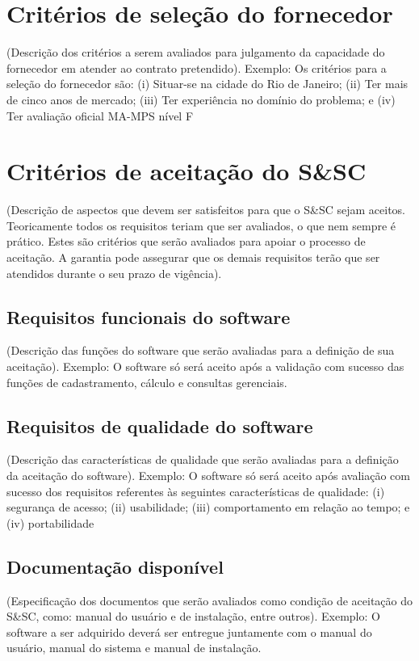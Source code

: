 \section{Critérios de seleção do fornecedor}
(Descrição dos critérios a serem avaliados para julgamento da capacidade do
fornecedor em atender ao contrato pretendido).
Exemplo: Os critérios para a seleção do fornecedor são:
(i) Situar-se na cidade do Rio de Janeiro;
(ii) Ter mais de cinco anos de mercado;
(iii) Ter experiência no domínio do problema; e
(iv) Ter avaliação oficial MA-MPS nível F

\section{Critérios de aceitação do S\&SC}
(Descrição de aspectos que devem ser satisfeitos para que o S\&SC sejam
aceitos. Teoricamente todos os requisitos teriam que ser avaliados, o que nem
sempre é prático. Estes são critérios que serão avaliados para apoiar o processo de
aceitação. A garantia pode assegurar que os demais requisitos terão que ser
atendidos durante o seu prazo de vigência).

\subsection{Requisitos funcionais do software}
(Descrição das funções do software que serão avaliadas para a definição
de sua aceitação).
Exemplo: O software só será aceito após a validação com sucesso das
funções de cadastramento, cálculo e consultas gerenciais.

\subsection{Requisitos de qualidade do software}
(Descrição das características de qualidade que serão avaliadas para a
definição da aceitação do software).
Exemplo: O software só será aceito após avaliação com sucesso dos
requisitos referentes às seguintes características de qualidade:
(i) segurança de acesso;
(ii) usabilidade;
(iii) comportamento em relação ao tempo; e
(iv) portabilidade

\subsection{Documentação disponível}
(Especificação dos documentos que serão avaliados como condição de
aceitação do S\&SC, como: manual do usuário e de instalação, entre outros).
Exemplo: O software a ser adquirido deverá ser entregue juntamente com o
manual do usuário, manual do sistema e manual de instalação.

